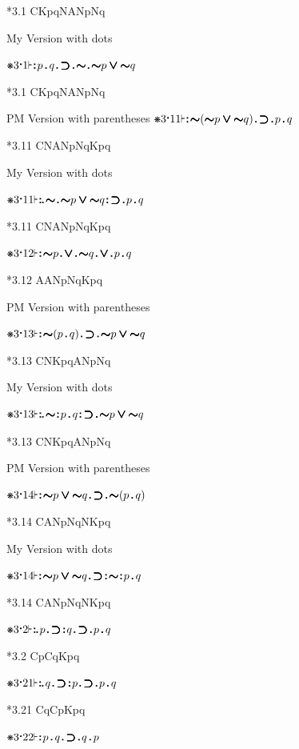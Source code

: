 \documentclass[12pt]{article}
\newcommand{\pmthm}{\mathpunct{\text{\scalebox{.5}[1]{$\boldsymbol\vdash$}}}} %
\newcommand{\pmast}{\text{\resizebox{!}{.75\height}{\ding{107}}}} %
\newcommand{\pmcdot}{\text{\raisebox{.05cm}{$\boldsymbol\cdot$}}} %
\newcommand{\pmd}{\hbox{\rule{.3ex}{.3ex}}} %
\newcommand{\pmdd}{\overset{\pmd}{\pmd}} %
\newcommand{\pmdot}{\mathinner{\pmd}}
\newcommand{\pmdott}{\mathinner{\pmdd}}
\newcommand{\pmdottt}{\mathinner{\pmdd\hspace{1pt}\pmd}}
\newcommand{\pmnot}{\mathord{\ooalign{$\boldsymbol{\sim}\mkern.5mu$\hidewidth\cr$\boldsymbol{\sim}$\cr\hidewidth$\mkern.5mu\boldsymbol{\sim}$}}}
\newcommand{\pmor}{\mathbin{\ooalign{$\boldsymbol{\vee}\mkern.5mu$\hidewidth\cr$\boldsymbol{\vee}$\cr\hidewidth$\mkern.5mu\boldsymbol{\vee}$}}}
\newcommand{\pmimp}{\mathbin{\ooalign{$\boldsymbol{\supset}\mkern.5mu$\hidewidth\cr$\boldsymbol{\supset}$\cr\hidewidth$\mkern.5mu\boldsymbol{\supset}$}}} %
\newcommand{\pmand}{\mathbin{\pmd}}%
\begin{document}
*3.1 CKpqNANpNq

My Version with dots

$\pmast 3 \pmcdot 1 \pmthm \pmdott p \pmand q \pmdot \pmimp \pmdot \pmnot \pmdot \pmnot p \pmor \pmnot q    $

*3.1 CKpqNANpNq

PM Version with parentheses
$\pmast 3 \pmcdot 11 \pmthm \pmdott \pmnot ( \pmnot p \pmor \pmnot q ) \pmdot \pmimp \pmdot  p   \pmand q   $

*3.11 CNANpNqKpq

My Version with dots

$\pmast 3 \pmcdot 11 \pmthm \pmdottt \pmnot \pmdot \pmnot p \pmor \pmnot q \pmdott \pmimp \pmdot  p   \pmand q   $

*3.11 CNANpNqKpq

$\pmast 3 \pmcdot 12 \pmthm \pmdott \pmnot p \pmdot \pmor \pmdot \pmnot q \pmdot \pmor \pmdot p \pmand q    $

*3.12 AANpNqKpq

PM Version with parentheses

$\pmast 3 \pmcdot 13 \pmthm \pmdott \pmnot ( p \pmand q ) \pmdot \pmimp \pmdot   \pmnot p \pmor \pmnot q   $

*3.13 CNKpqANpNq

My Version with dots

$\pmast 3 \pmcdot 13 \pmthm \pmdottt \pmnot \pmdott p \pmand q \pmdott \pmimp \pmdot   \pmnot p \pmor \pmnot q   $

*3.13 CNKpqANpNq

PM Version with parentheses

$\pmast 3 \pmcdot 14 \pmthm \pmdott \pmnot p \pmor \pmnot q \pmdot \pmimp \pmdot \pmnot ( p \pmand q )     $

*3.14 CANpNqNKpq

My Version with dots

$\pmast 3 \pmcdot 14 \pmthm \pmdott \pmnot p \pmor \pmnot q \pmdot \pmimp \pmdott \pmnot \pmdott p \pmand q     $

*3.14 CANpNqNKpq

$\pmast 3 \pmcdot 2 \pmthm \pmdottt p \pmdot \pmimp \pmdott q \pmdot \pmimp \pmdot p \pmand q      $

*3.2 CpCqKpq

$\pmast 3 \pmcdot 21 \pmthm \pmdottt q \pmdot \pmimp \pmdott p \pmdot \pmimp \pmdot p \pmand q    $

*3.21 CqCpKpq


$\pmast 3 \pmcdot 22 \pmthm \pmdott p \pmand q \pmdot \pmimp \pmdot q \pmand p    $
\end{document}
